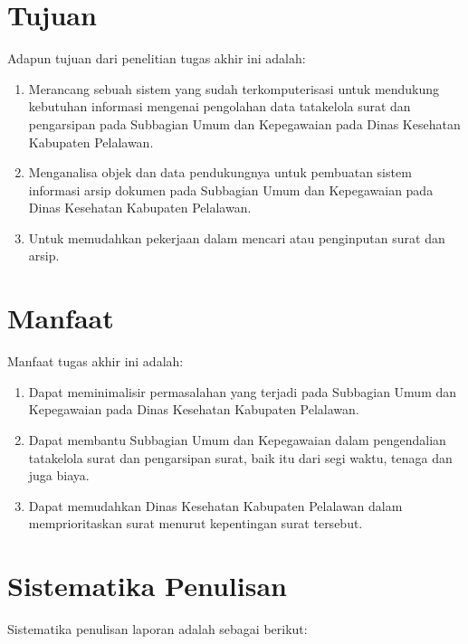 \section{Tujuan}
Adapun tujuan dari penelitian tugas akhir ini adalah:
\begin{enumerate}
	\item Merancang sebuah sistem yang sudah terkomputerisasi untuk mendukung kebutuhan informasi mengenai pengolahan data tatakelola surat dan pengarsipan pada Subbagian Umum dan Kepegawaian pada Dinas Kesehatan Kabupaten Pelalawan.
	\item Menganalisa objek dan data pendukungnya untuk pembuatan sistem informasi arsip dokumen pada Subbagian Umum dan Kepegawaian pada Dinas Kesehatan Kabupaten Pelalawan.
	\item Untuk memudahkan pekerjaan dalam mencari atau penginputan surat dan arsip.
\end{enumerate}

\section{Manfaat}
Manfaat tugas akhir ini adalah:
\begin{enumerate}
	\item Dapat meminimalisir permasalahan yang terjadi pada Subbagian Umum dan Kepegawaian pada Dinas Kesehatan Kabupaten Pelalawan.
	\item Dapat membantu Subbagian Umum dan Kepegawaian dalam pengendalian tatakelola surat dan pengarsipan surat, baik itu dari segi waktu, tenaga dan juga biaya.
	\item Dapat memudahkan Dinas Kesehatan Kabupaten Pelalawan dalam memprioritaskan surat menurut kepentingan surat tersebut.
\end{enumerate}

\section{Sistematika Penulisan}
Sistematika penulisan laporan adalah sebagai berikut:

